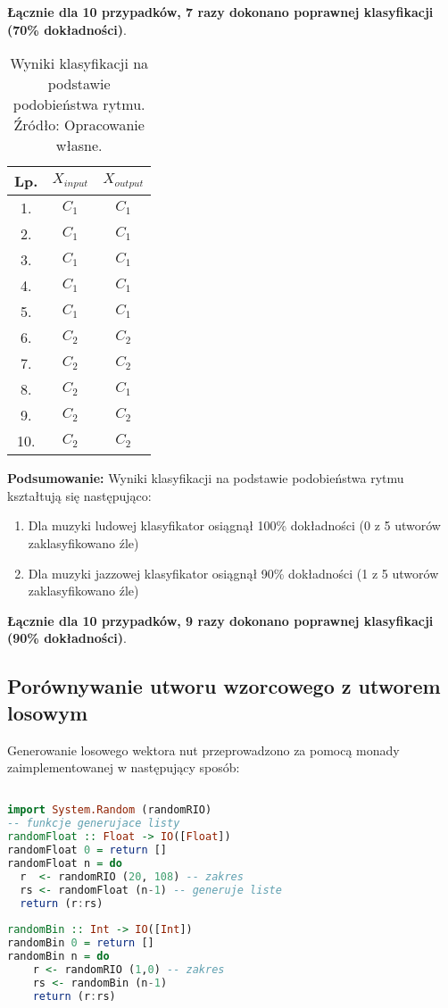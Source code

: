 \textbf{Łącznie dla 10 przypadków, 7 razy dokonano poprawnej klasyfikacji (70\% dokładności)}.
\FloatBarrier
\begin{table}[h]
\begin{tabular}{|c|c|c|}
\hline
Lp. & $X_{input}$ & $X_{output}$ \\ \hline
1.   & $C_{1}$      & $C_{1}$      \\ \hline
2.   & $C_{1}$      & $C_{1}$     \\ \hline
3.   & $C_{1}$      & $C_{1}$      \\ \hline
4.   & $C_{1}$      & $C_{1}$     \\ \hline
5.   & $C_{1}$      & $C_{1}$      \\ \hline
6.   & $C_{2}$      & $C_{2}$    \\ \hline
7.   & $C_{2}$      & $C_{2}$     \\ \hline
8.   & $C_{2}$      & $C_{1}$     \\ \hline
9.   & $C_{2}$      & $C_{2}$     \\ \hline
10.  & $C_{2}$      & $C_{2}$      \\ \hline
\end{tabular}
\centering
\caption{Wyniki klasyfikacji na podstawie podobieństwa rytmu. Źródło: Opracowanie własne.}
\end{table}
\FloatBarrier

\textbf{Podsumowanie:}
Wyniki klasyfikacji na podstawie podobieństwa rytmu kształtują się następująco:

\begin{enumerate}
    \item Dla muzyki ludowej klasyfikator osiągnął 100\% dokładności (0 z 5 utworów zaklasyfikowano źle)
    \item Dla muzyki jazzowej klasyfikator osiągnął 90\% dokładności (1 z 5 utworów zaklasyfikowano źle)
\end{enumerate}

\textbf{Łącznie dla 10 przypadków, 9 razy dokonano poprawnej klasyfikacji (90\% dokładności)}.





\subsection{Porównywanie utworu wzorcowego z utworem losowym}

Generowanie losowego wektora nut przeprowadzono za pomocą monady zaimplementowanej w następujący sposób:
\begin{lstlisting}[language = Haskell]

import System.Random (randomRIO) 
-- funkcje generujace listy 
randomFloat :: Float -> IO([Float])
randomFloat 0 = return []
randomFloat n = do
  r  <- randomRIO (20, 108) -- zakres
  rs <- randomFloat (n-1) -- generuje liste
  return (r:rs)
  
randomBin :: Int -> IO([Int])
randomBin 0 = return []
randomBin n = do
    r <- randomRIO (1,0) -- zakres
    rs <- randomBin (n-1)
    return (r:rs)
\end{lstlisting}


